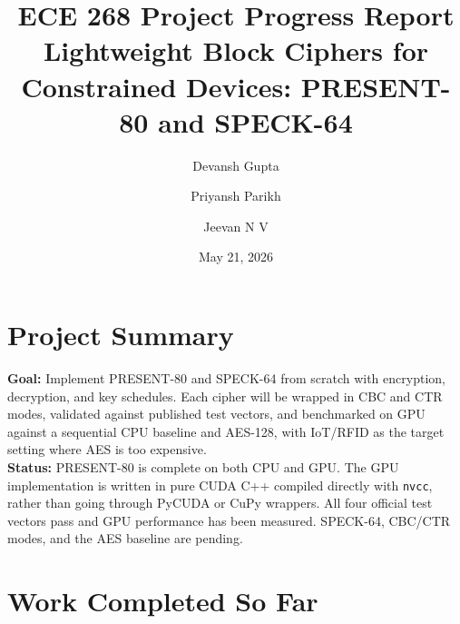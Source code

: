 \documentclass[10pt]{article}
\title{\vspace{-1.5em}ECE 268 Project Progress Report\\[0.2em]
\large Lightweight Block Ciphers for Constrained Devices: PRESENT-80 and SPECK-64}
\author{%
  Devansh Gupta \and
  Priyansh Parikh \and
  Jeevan N V
}
\date{May 21, 2026}
\begin{document}
\maketitle
\vspace{-1.2em}

\section*{Project Summary}
\textbf{Goal:} Implement PRESENT-80 and SPECK-64 from scratch with encryption, decryption,
and key schedules. Each cipher will be wrapped in CBC and CTR modes, validated against
published test vectors, and benchmarked on GPU against a sequential CPU baseline and
AES-128, with IoT/RFID as the target setting where AES is too expensive. \\
\textbf{Status:} PRESENT-80 is complete on both CPU and GPU. The GPU implementation
is written in pure CUDA C++ compiled directly with \texttt{nvcc}, rather than going
through PyCUDA or CuPy wrappers. All four official test vectors pass and GPU
performance has been measured. SPECK-64, CBC/CTR modes, and the AES baseline are
pending.

\section{Work Completed So Far}
\end{document}
